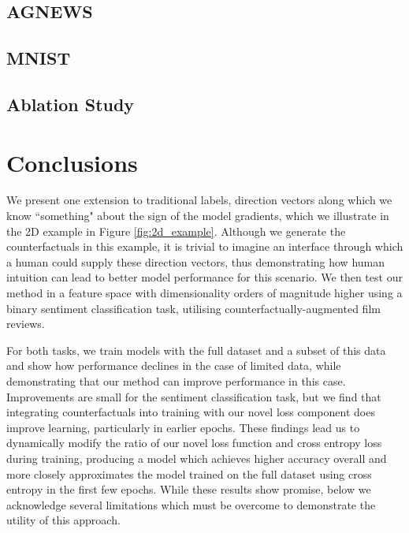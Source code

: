 \documentclass[sigconf,anonymous]{aamas}
\begin{document}
\subsection{AGNEWS}

\subsection{MNIST}


\subsection{Ablation Study}


\section{Conclusions}
We present one extension to traditional labels, direction vectors along which we know ``something" about the sign of the model gradients, which we illustrate in the 2D example in Figure \ref{fig:2d_example}. Although we generate the counterfactuals in this example, it is trivial to imagine an interface through which a human could supply these direction vectors, thus demonstrating how human intuition can lead to better model performance for this scenario. We then test our method in a feature space with dimensionality orders of magnitude higher using a binary sentiment classification task, utilising counterfactually-augmented film reviews\cite{Kaushik2020Learning}.

For both tasks, we train models with the full dataset and a subset of this data and show how performance declines in the case of limited data, while demonstrating that our method can improve performance in this case. Improvements are small for the sentiment classification task, but we find that integrating counterfactuals into training with our novel loss component does improve learning, particularly in earlier epochs. These findings lead us to dynamically modify the ratio of our novel loss function and cross entropy loss during training, producing a model which achieves higher accuracy overall and more closely approximates the model trained on the full dataset using cross entropy in the first few epochs. While these results show promise, below we acknowledge several limitations which must be overcome to demonstrate the utility of this approach.
\end{document}
